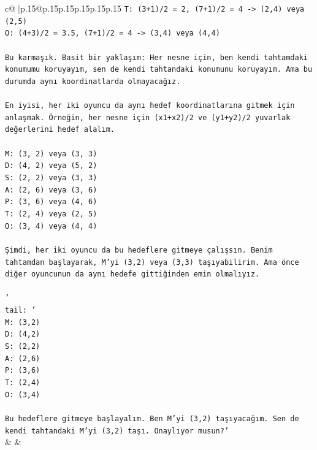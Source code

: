 \documentclass{article}
\begin{document}
{\begin{supertabular}{c@{$\;$}|p{.15\linewidth}@{}p{.15\linewidth}p{.15\linewidth}p{.15\linewidth}p{.15\linewidth}p{.15\linewidth}}
{{{\texttt{T: (3+1)/2 = 2, (7+1)/2 = 4 {-}> (2,4) veya (2,5)} \\
\texttt{O: (4+3)/2 = 3.5, (7+1)/2 = 4 {-}> (3,4) veya (4,4)} \\
\\ 
\texttt{Bu karmaşık. Basit bir yaklaşım: Her nesne için, ben kendi tahtamdaki konumumu koruyayım, sen de kendi tahtandaki konumunu koruyayım. Ama bu durumda aynı koordinatlarda olmayacağız.} \\
\\ 
\texttt{En iyisi, her iki oyuncu da aynı hedef koordinatlarına gitmek için anlaşmak. Örneğin, her nesne için (x1+x2)/2 ve (y1+y2)/2 yuvarlak değerlerini hedef alalım.} \\
\\ 
\texttt{M: (3, 2) veya (3, 3)} \\
\texttt{D: (4, 2) veya (5, 2)} \\
\texttt{S: (2, 2) veya (3, 3)} \\
\texttt{A: (2, 6) veya (3, 6)} \\
\texttt{P: (3, 6) veya (4, 6)} \\
\texttt{T: (2, 4) veya (2, 5)} \\
\texttt{O: (3, 4) veya (4, 4)} \\
\\ 
\texttt{Şimdi, her iki oyuncu da bu hedeflere gitmeye çalışsın. Benim tahtamdan başlayarak, M'yi (3,2) veya (3,3) taşıyabilirim. Ama önce diğer oyuncunun da aynı hedefe gittiğinden emin olmalıyız.} \\
\\ 
\texttt{'} \\
\texttt{tail: '} \\
\texttt{M: (3,2)} \\
\texttt{D: (4,2)} \\
\texttt{S: (2,2)} \\
\texttt{A: (2,6)} \\
\texttt{P: (3,6)} \\
\texttt{T: (2,4)} \\
\texttt{O: (3,4)} \\
\\ 
\texttt{Bu hedeflere gitmeye başlayalım. Ben M'yi (3,2) taşıyacağım. Sen de kendi tahtandaki M'yi (3,2) taşı. Onaylıyor musun?'} \\
            }
        }
    }
    & & \\ \\


\end{supertabular}}
\end{document}
